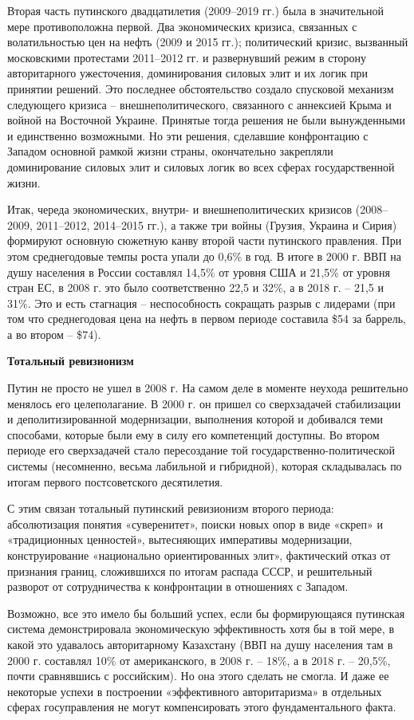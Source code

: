Вторая часть путинского двадцатилетия (2009–2019 гг.) была в значительной мере противоположна первой. Два экономических кризиса, связанных с волатильностью цен на нефть (2009 и 2015 гг.); политический кризис, вызванный московскими протестами 2011–2012 гг. и развернувший режим в сторону авторитарного ужесточения, доминирования силовых элит и их логик при принятии решений. Это последнее обстоятельство создало спусковой механизм следующего кризиса – внешнеполитического, связанного с аннексией Крыма и войной на Восточной Украине. Принятые тогда решения не были вынужденными и единственно возможными. Но эти решения, сделавшие конфронтацию с Западом основной рамкой жизни страны, окончательно закрепляли доминирование силовых элит и силовых логик во всех сферах государственной жизни.

Итак, череда экономических, внутри- и внешнеполитических кризисов (2008–2009, 2011–2012, 2014–2015 гг.), а также три войны (Грузия, Украина и Сирия) формируют основную сюжетную канву второй части путинского правления. При этом среднегодовые темпы роста упали до 0,6\% в год. В итоге в 2000 г. ВВП на душу населения в России составлял 14,5\% от уровня США и 21,5\% от уровня стран ЕС, в 2008 г. это было соответственно 22,5 и 32\%, а в 2018 г. – 21,5 и 31\%. Это и есть стагнация – неспособность сокращать разрыв с лидерами (при том что среднегодовая цена на нефть в первом периоде составила \$54 за баррель, а во втором – \$74).

\textbf{Тотальный ревизионизм}



Путин не просто не ушел в 2008 г. На самом деле в моменте неухода решительно менялось его целеполагание. В 2000 г. он пришел со сверхзадачей стабилизации и деполитизированной модернизации, выполнения которой и добивался теми способами, которые были ему в силу его компетенций доступны. Во втором периоде его сверхзадачей стало пересоздание той государственно-политической системы (несомненно, весьма лабильной и гибридной), которая складывалась по итогам первого постсоветского десятилетия.

С этим связан тотальный путинский ревизионизм второго периода: абсолютизация понятия «суверенитет», поиски новых опор в виде «скреп» и «традиционных ценностей», вытесняющих императивы модернизации, конструирование «национально ориентированных элит», фактический отказ от признания границ, сложившихся по итогам распада СССР, и решительный разворот от сотрудничества к конфронтации в отношениях с Западом.

Возможно, все это имело бы больший успех, если бы формирующаяся путинская система демонстрировала экономическую эффективность хотя бы в той мере, в какой это удавалось авторитарному Казахстану (ВВП на душу населения там в 2000 г. составлял 10\% от американского, в 2008 г. – 18\%, а в 2018 г. – 20,5\%, почти сравнявшись с российским). Но она этого сделать не смогла. И даже ее некоторые успехи в построении «эффективного авторитаризма» в отдельных сферах госуправления не могут компенсировать этого фундаментального факта.

